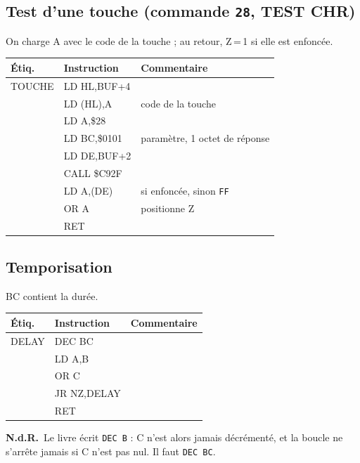 \documentclass[a4paper,10pt]{article}
\makeatletter
\newcommand{\hex}[1]{\texttt{#1}}
\newcommand{\nota}[1]{\textcolor{red!60!black}{\small\textbf{N.d.R.}~#1}}
\newenvironment{src}
  {\small\begin{longtable}{@{}>{\ttfamily}l>{\ttfamily}l>{\raggedright\arraybackslash}p{8.6cm}@{}}
   \toprule
   \normalfont\bfseries Étiq. & \normalfont\bfseries Instruction & \textbf{Commentaire}\\
   \midrule\endhead
   \bottomrule\endfoot}
  {\end{longtable}}
\makeatother
\begin{document}
\subsection{Test d'une touche (commande \hex{28}, TEST CHR)}
On charge A avec le code de la touche ; au retour, Z\,=\,1 si elle est
enfoncée.
\begin{src}
TOUCHE & LD HL,BUF+4 & \\
 & LD (HL),A & code de la touche \\
 & LD A,\$28 & \\
 & LD BC,\$0101 & 1 paramètre, 1 octet de réponse \\
 & LD DE,BUF+2 & \\
 & CALL \$C92F & \\
 & LD A,(DE) & 0 si enfoncée, sinon \hex{FF} \\
 & OR A & positionne Z \\
 & RET & \\
\end{src}

\subsection{Temporisation}
BC contient la durée.
\begin{src}
DELAY & DEC BC & \\
 & LD A,B & \\
 & OR C & \\
 & JR NZ,DELAY & \\
 & RET & \\
\end{src}
\nota{Le livre écrit \texttt{DEC B} : C n'est alors jamais décrémenté, et la
boucle ne s'arrête jamais si C n'est pas nul. Il faut \texttt{DEC BC}.}
\end{document}
